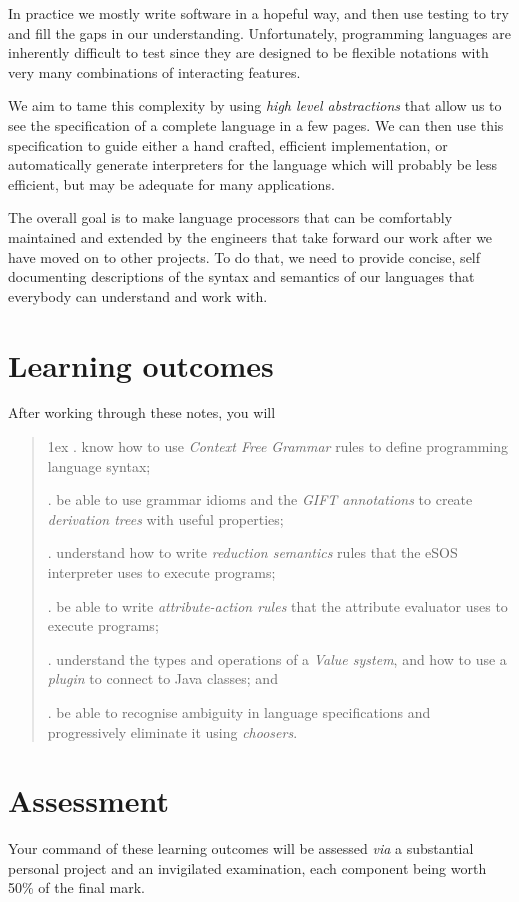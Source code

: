 \documentclass[11pt]{book}
\begin{document}
In practice we mostly write software in a hopeful way, and then use testing to try and fill the gaps in
our understanding. Unfortunately, programming languages are inherently difficult to test since they are
designed to be flexible notations with very many combinations of interacting features.

We aim to tame this complexity by using {\em high level abstractions} that allow us to see the
specification of a complete language in a few pages. We can then use this specification to guide either a
hand crafted, efficient implementation, or automatically generate interpreters for the language which will
probably be less efficient, but may be adequate for many applications.

The overall goal is to make language processors that can be comfortably maintained and extended by the
engineers that take forward our work after we have moved on to other projects. To do that, we need to
provide concise, self documenting descriptions of the syntax and semantics of our languages that everybody
can understand and work with.

\section{Learning outcomes}
After working through these notes, you will
\begin{quotation}
\parskip1ex
. know how to use {\em Context Free Grammar} rules to define programming language syntax;

. be able to use grammar idioms and the {\em GIFT annotations} to create {\em derivation trees} with useful properties;

. understand how to write {\em reduction semantics} rules that the eSOS interpreter uses to execute programs;

. be able to write {\em attribute-action rules} that the attribute evaluator uses to execute programs;

. understand the types and operations of a {\em Value system}, and how to use a {\em plugin} to connect to Java classes; and

. be able to recognise ambiguity in language specifications and progressively eliminate it using {\em choosers}.
 \end{quotation}
\section{Assessment}
Your command of these learning outcomes will be assessed {\em via} a substantial personal project and an invigilated examination, each component being worth 50\% of the final mark. 
\end{document}
